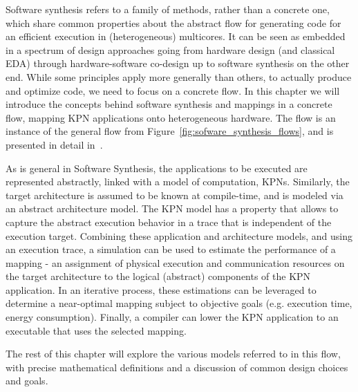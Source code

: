 %

Software synthesis refers to a family of methods, rather than a concrete one, which share common properties about the abstract flow for generating code for an efficient execution in (heterogeneous) multicores.
It can be seen as embedded in a spectrum of design approaches going from hardware design (and classical \ac{EDA}) through hardware-software co-design up to software synthesis on the other end. 
While some principles apply more generally than others, to actually produce and optimize code, we need to focus on a concrete flow.
In this chapter we will introduce the concepts behind software synthesis and mappings in a concrete flow, mapping KPN applications onto heterogeneous hardware.
The flow is an instance of the general flow from Figure~\ref{fig:sofware_synthesis_flows}, and is presented in detail in~\cite{castrillon2014thesis}. 


As is general in Software Synthesis, the applications to be executed are represented abstractly, linked with a model of computation, \acfp{KPN}.
Similarly, the target architecture is assumed to be known at compile-time, and is modeled via an abstract architecture model.
The \ac{KPN} model has a property that allows to capture the abstract execution behavior in a trace that is independent of the execution target.
Combining these application and architecture models, and using an execution trace, a simulation can be used to estimate the performance of a mapping - an assignment of physical execution and communication resources on the target architecture to the logical (abstract) components of the \ac{KPN} application.
In an iterative process, these estimations can be leveraged to determine a near-optimal mapping subject to objective goals (e.g. execution time, energy consumption).
Finally, a compiler can lower the KPN application to an executable that uses the selected mapping.

The rest of this chapter will explore the various models referred to in this flow, with precise mathematical definitions and a discussion of common design choices and goals.